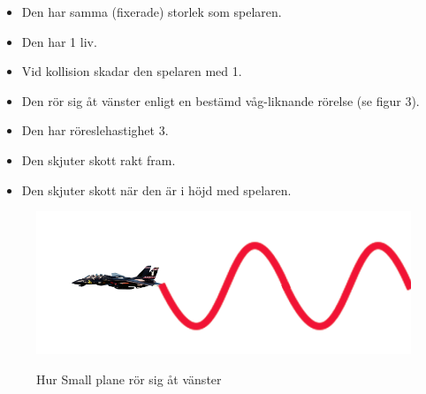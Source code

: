 \documentclass{TDP005mall}
\begin{document}
\begin{itemize}
\item Den har samma (fixerade) storlek som spelaren.
\item Den har 1 liv.
\item Vid kollision skadar den spelaren med 1.
\item Den rör sig åt vänster enligt en bestämd våg-liknande rörelse (se figur 3).
\item Den har röreslehastighet 3. 
\item Den skjuter skott rakt fram.
\item Den skjuter skott när den är i höjd med spelaren.
\end{itemize}
\begin{figure}[h!]
  \centering
  \includegraphics[scale=0.4]{Images/Enemy1-movement.png}
  \label{}
  \caption{Hur Small plane rör sig åt vänster}
\end{figure}



\newpage
\end{document}
